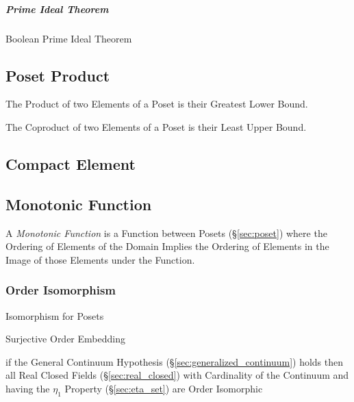 \subparagraph{Prime Ideal Theorem}\label{sec:prime_ideal_theorem}\hfill

Boolean Prime Ideal Theorem



\subsection{Poset Product}\label{sec:poset_product}

The Product of two Elements of a Poset is their Greatest Lower Bound.

The Coproduct of two Elements of a Poset is their Least Upper Bound.



\subsection{Compact Element}\label{sec:compact_element}

\subsection{Monotonic Function}\label{sec:monotonic_function}

A \emph{Monotonic Function} is a Function between Posets
(\S\ref{sec:poset}) where the Ordering of Elements of the Domain
Implies the Ordering of Elements in the Image of those Elements under
the Function.



\subsubsection{Order Isomorphism}\label{sec:order_isomorphism}

Isomorphism for Posets

Surjective Order Embedding

if the General Continuum Hypothesis (\S\ref{sec:generalized_continuum}) holds
then all Real Closed Fields (\S\ref{sec:real_closed}) with Cardinality of the
Continuum and having the $\eta_1$ Property (\S\ref{sec:eta_set}) are Order
Isomorphic



